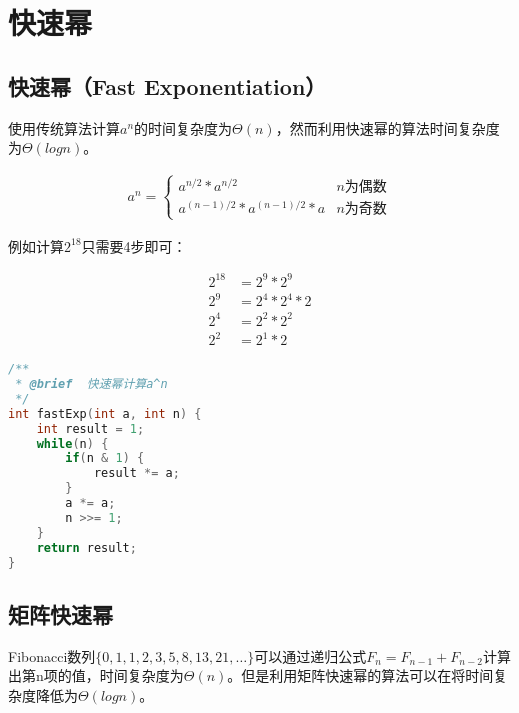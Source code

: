 \newpage

\section{快速幂}

\subsection{快速幂（Fast Exponentiation）}

使用传统算法计算$ a^n $的时间复杂度为$ \Theta(n) $，然而利用快速幂的算法时间复杂度为$ \Theta(logn) $。

\vspace{-0.5cm}

\begin{align*}
	a^n = \begin{cases}
		a^{n/2} * a^{n/2}             & n\text{为偶数} \\
		a^{(n-1)/2} * a^{(n-1)/2} * a & n\text{为奇数}
	\end{cases}
\end{align*}

例如计算$ 2^{18} $只需要4步即可：

\vspace{-1cm}

\begin{align*}
	2^{18} & = 2^9 * 2^9     \\
	2^9    & = 2^4 * 2^4 * 2 \\
	2^4    & = 2^2 * 2^2     \\
	2^2    & = 2^1 * 2
\end{align*}


\begin{lstlisting}[language=C]
/**
 * @brief  快速幂计算a^n
 */
int fastExp(int a, int n) {
    int result = 1;
    while(n) {
        if(n & 1) {
            result *= a;
        }
        a *= a;
        n >>= 1;
    }
    return result;
}
\end{lstlisting}

\vspace{0.5cm}

\subsection{矩阵快速幂}

Fibonacci数列$ \{0, 1, 1, 2, 3, 5, 8, 13, 21, \dots \} $可以通过递归公式$ F_n = F_{n-1} + F_{n-2} $计算出第n项的值，时间复杂度为$ \Theta(n) $。但是利用矩阵快速幂的算法可以在将时间复杂度降低为$ \Theta(logn) $。\\

